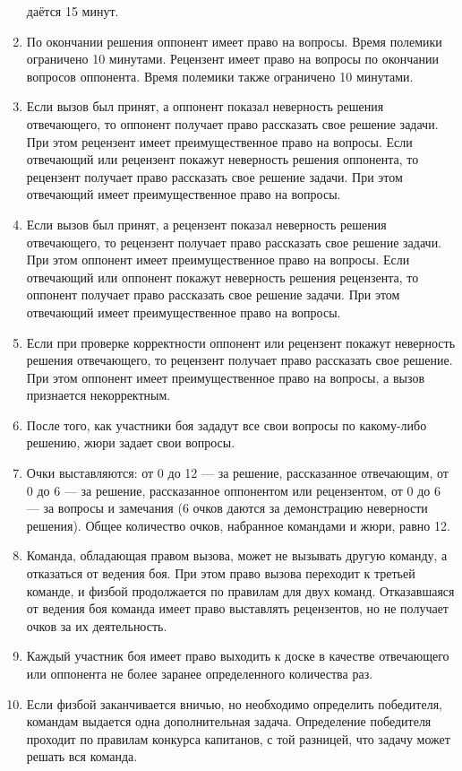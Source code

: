 \documentclass[11pt]{article}
\begin{document}
\begin{enumerate}
  даётся 15 минут.
\item По окончании решения оппонент имеет право на вопросы. Время
  полемики ограничено 10 минутами. Рецензент имеет право на вопросы по
  окончании вопросов оппонента. Время полемики также ограничено 10
  минутами. 
\item Если вызов был принят, а оппонент показал неверность решения
  отвечающего, то оппонент получает право рассказать свое решение
  задачи. При этом рецензент имеет преимущественное право на
  вопросы. Если отвечающий или рецензент покажут неверность решения
  оппонента, то рецензент получает право рассказать свое решение
  задачи. При этом отвечающий имеет преимущественное право на
  вопросы. 
\item Если вызов был принят, а рецензент показал неверность решения
  отвечающего, то рецензент получает право рассказать свое решение
  задачи. При этом оппонент имеет преимущественное право на
  вопросы. Если отвечающий или оппонент покажут неверность решения
  рецензента, то оппонент получает право рассказать свое решение
  задачи. При этом отвечающий имеет преимущественное право на вопросы.
\item Если при проверке корректности оппонент или рецензент покажут
  неверность решения отвечающего, то рецензент получает право
  рассказать свое решение. При этом оппонент имеет преимущественное
  право на вопросы, а вызов признается некорректным.
\item После того, как участники боя зададут все свои вопросы по
  какому-либо решению, жюри задает свои вопросы.
\item Очки выставляются: от 0 до 12 --- за решение, рассказанное
  отвечающим, от 0 до 6 --- за решение, рассказанное оппонентом или
  рецензентом, от 0 до 6 --- за вопросы и замечания (6 очков даются за
  демонстрацию неверности решения). Общее количество очков, набранное
  командами и жюри, равно 12.
\item Команда, обладающая правом вызова, может не вызывать другую
  команду, а отказаться от ведения боя. При этом право вызова
  переходит к третьей команде, и физбой продолжается по правилам для
  двух команд. Отказавшаяся от ведения боя команда имеет право
  выставлять рецензентов, но не получает очков за их деятельность.
\item Каждый участник боя имеет право выходить к доске в качестве
  отвечающего или оппонента не более заранее определенного количества
  раз.
\item Если физбой заканчивается вничью, но необходимо определить
  победителя, командам выдается одна дополнительная
  задача. Определение победителя проходит по правилам конкурса
  капитанов, с той разницей, что задачу может решать вся команда.
\end{enumerate}
\end{document}
